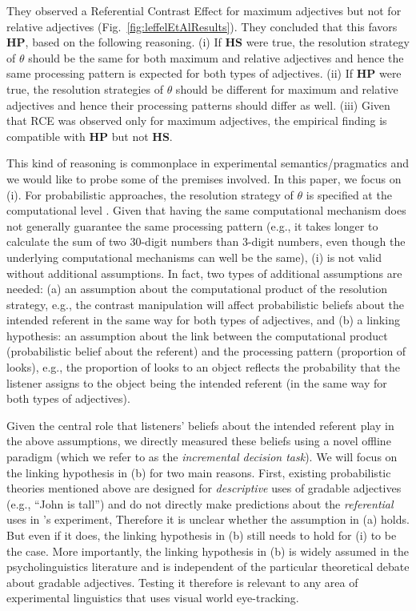 \documentclass[10pt,letterpaper]{article}
\begin{document}
They observed a Referential Contrast Effect  for maximum adjectives but not for relative adjectives (Fig.~\ref{fig:leffelEtAlResults}).
They concluded that this favors \textbf{HP}, based on the following reasoning.
(i) If \textbf{HS} were true, the resolution strategy of $\theta$ 
should be the same for both maximum and relative adjectives and hence the same processing pattern is expected for both types of adjectives.
(ii) If \textbf{HP} were true, the resolution strategies of $\theta$ should be different for maximum
 and relative adjectives and hence their processing patterns should differ as well.
(iii) Given that RCE was observed only for maximum adjectives, the empirical finding is compatible with \textbf{HP} but not \textbf{HS}.

This kind of reasoning is commonplace in experimental semantics/pragmatics and we would like to probe some of the premises involved. In this paper, we focus on (i). For probabilistic approaches, the resolution strategy of $\theta$ is specified at the 
 computational level \cite{marr1982}.
Given that having the same computational mechanism does not generally guarantee the same processing pattern 
 (e.g., it takes longer to calculate the sum of two 30-digit numbers than 3-digit numbers, even though the
 underlying computational mechanisms can well be the same), (i) is not valid without additional assumptions.
In fact, two types of additional assumptions are needed: (a) an assumption about the computational product of the resolution strategy, e.g., the contrast manipulation will affect probabilistic beliefs about the intended referent in the same way for both types of adjectives, and (b) a linking hypothesis: an assumption about the link between the computational product (probabilistic belief about the referent) and the processing pattern (proportion of looks), e.g., the proportion of looks to an object reflects the probability that the listener 
assigns to the object being the intended referent (in the same way for both types of adjectives). 

 
Given the central role that listeners' beliefs about the intended referent play in the above assumptions, 
we directly measured these beliefs using a novel offline paradigm (which we refer to as the  \emph{incremental decision task}).
We will focus on the linking hypothesis in (b) for two main reasons.
First, existing probabilistic theories mentioned above are designed for \emph{descriptive} uses of 
 gradable adjectives (e.g., ``John is tall'') and do not directly make predictions about the 
 \emph{referential} uses in \citeauthor{LeffelXiangKennedy2016:Imprecision-is-Pragmatic-}'s experiment,
Therefore it is unclear whether the assumption in (a) holds.
But even if it does, the linking hypothesis in (b) still needs to hold for (i) to be the case.
More importantly, the linking hypothesis in (b) is widely assumed in the 
 psycholinguistics literature and is independent of the particular theoretical debate about 
 gradable adjectives. Testing it therefore is relevant to any area of  experimental linguistics that uses visual world eye-tracking.
\end{document}
